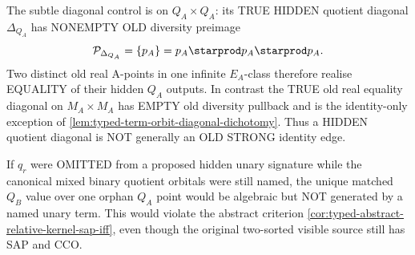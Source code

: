 \begin{example}
The subtle diagonal control
is on $Q_A\times Q_A$:
its TRUE HIDDEN quotient
diagonal $\Delta_{Q_A}$
has NONEMPTY OLD diversity
preimage
\[
     \mathcal P_{\Delta_{Q_A}}
       =\{p_A\}
       =p_A\starprod p_A\starprod p_A.
\]
Two distinct old real A-points
in one infinite $E_A$-class
therefore realise EQUALITY
of their hidden $Q_A$ outputs.
In contrast the TRUE old
real equality diagonal on
$M_A\times M_A$ has EMPTY
old diversity pullback
and is the identity-only
exception of
\cref{lem:typed-term-orbit-diagonal-dichotomy}.
Thus a HIDDEN quotient
diagonal is NOT generally
an OLD STRONG identity edge.

If $q_r$ were OMITTED
from a proposed hidden
unary signature while
the canonical mixed
binary quotient orbitals
were still named, the
unique matched $Q_B$ value
over one orphan $Q_A$ point
would be algebraic but
NOT generated by a
named unary term. This
would violate the abstract
criterion
\cref{cor:typed-abstract-relative-kernel-sap-iff},
even though the original
two-sorted visible source
still has SAP and CCO.
\end{example}
